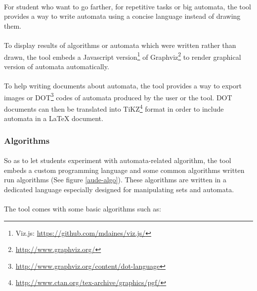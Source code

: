 \documentclass{article}
\begin{document}
\begin{sloppypar}
         
\paragraph{}
For student who want to go farther, for repetitive tasks or big automata, the tool provides a way to write automata using a concise language instead of drawing them.

         
\paragraph{}
To display results of algorithms or automata which were written rather than drawn, the tool embeds a Javascript version\footnote{Viz.js: \href{https://github.com/mdaines/viz.js/}{https://github.com/mdaines/viz.js/}} of Graphviz\footnote{\href{http://www.graphviz.org/}{http://www.graphviz.org/}} to render graphical version of automata automatically.

         
\paragraph{}
To help writing documents about automata, the tool provides a way to export images or DOT\footnote{\href{http://www.graphviz.org/content/dot-language}{http://www.graphviz.org/content/dot-language}} codes of automata produced by the user or the tool. DOT documents can then be translated into TiKZ\footnote{\href{http://www.ctan.org/tex-archive/graphics/pgf/}{http://www.ctan.org/tex-archive/graphics/pgf/}} format in order to include automata in a LaTeX document.
      
   
      

\subsubsection{ Algorithms}


\paragraph{}
So as to let students experiment with automata-related algorithm, the tool embeds a custom programming language and some common algorithms written run algorithms (See figure \ref{aude-algo}). These algorithms are written in a dedicated language especially designed for manipulating sets and automata. 

         
\paragraph{}
The tool comes with some basic algorithms such as:
          

\end{sloppypar}
\end{document}
